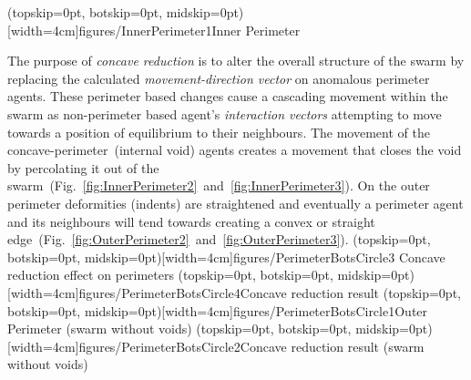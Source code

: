\documentclass{ieeeaccess}
\begin{document}
\Figure[t!](topskip=0pt, botskip=0pt, midskip=0pt)[width=4cm]{figures/InnerPerimeter1}{Inner Perimeter\label{fig:InnerPerimeter1}}

The purpose of \textit{concave reduction} is to alter the overall structure of the swarm by replacing the calculated \textit{movement-direction vector} on anomalous perimeter agents. These perimeter based changes cause a cascading movement within the swarm as non-perimeter based agent's \textit{interaction vectors} attempting to move towards a position of equilibrium to their neighbours. The movement of the concave-perimeter~(internal void) agents creates a movement that closes the void by percolating it out of the swarm~(Fig.~\ref{fig:InnerPerimeter2}~and~\ref{fig:InnerPerimeter3}). On the outer perimeter deformities (indents) are straightened and eventually a perimeter agent and its neighbours will tend towards creating a convex or straight edge~(Fig.~\ref{fig:OuterPerimeter2}~and~\ref{fig:OuterPerimeter3}).
\Figure[t!](topskip=0pt, botskip=0pt, midskip=0pt)[width=4cm]{figures/PerimeterBotsCircle3}
{Concave reduction effect on perimeters\label{fig:InnerPerimeter2}}
\Figure[t!](topskip=0pt, botskip=0pt, midskip=0pt)[width=4cm]{figures/PerimeterBotsCircle4}{Concave reduction result\label{fig:InnerPerimeter3}}
\Figure[t!](topskip=0pt, botskip=0pt, midskip=0pt)[width=4cm]{figures/PerimeterBotsCircle1}{Outer Perimeter (swarm without voids)\label{fig:OuterPerimeter2}}
\Figure[t!](topskip=0pt, botskip=0pt, midskip=0pt)[width=4cm]{figures/PerimeterBotsCircle2}{Concave reduction result (swarm without voids)\label{fig:OuterPerimeter3}}
\end{document}

